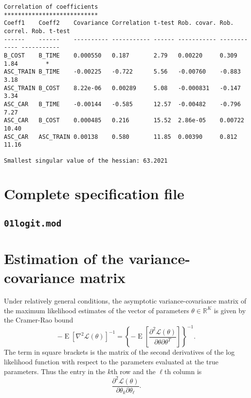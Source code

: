 \documentclass[12pt,a4paper]{article}
\newcommand{\R}{\mathbb{R}}
\renewcommand{\L}{\mathcal{L}}
\newcommand{\expect}{\operatorname{E}}
\begin{document}
\begin{lstlisting}[style=tiny]
Correlation of coefficients
***************************
Coeff1    Coeff2    Covariance Correlation t-test Rob. covar. Rob. correl. Rob. t-test   
------    ------    ---------- ----------- ------ ----------- ------------ -----------   
B_COST    B_TIME    0.000550   0.187       2.79   0.00220     0.309        1.84        * 
ASC_TRAIN B_TIME    -0.00225   -0.722      5.56   -0.00760    -0.883       3.18          
ASC_TRAIN B_COST    8.22e-06   0.00289     5.08   -0.000831   -0.147       3.34          
ASC_CAR   B_TIME    -0.00144   -0.585      12.57  -0.00482    -0.796       7.27          
ASC_CAR   B_COST    0.000485   0.216       15.52  2.86e-05    0.00722      10.40         
ASC_CAR   ASC_TRAIN 0.00138    0.580       11.85  0.00390     0.812        11.16         

Smallest singular value of the hessian: 63.2021
\end{lstlisting}

\clearpage 


\appendix

\section{Complete specification file}

\subsection{\lstinline$01logit.mod$}
\label{sec:modelBison}


\clearpage

   \section{Estimation of the  variance-covariance matrix}
   \label{sec:robust}
Under relatively general conditions,  the asymptotic
variance-covariance matrix of the maximum likelihood
estimates of the vector of parameters $\theta \in \R^K$ is given by the Cramer-Rao bound
\begin{equation}
  \label{eq:RaoCramer}
  -\expect\left[ \nabla^2 \L(\theta)\right]^{-1} =  \left\{-\expect\left[\frac{\partial^2 \L(\theta)}{\partial \theta \partial \theta^T}\right]\right\}^{-1}.
\end{equation}
The term in square brackets is the matrix of the second derivatives
of the log likelihood function with respect to the parameters
evaluated at the true parameters.  Thus the entry in the $k$\/th row and
the $\ell$\/th column is
\begin{equation}
  \label{eq:BAL4.34}
 \frac{\partial^2 \L(\theta)}{\partial \theta_k \partial \theta_{\ell}}.
\end{equation}
\end{document}
